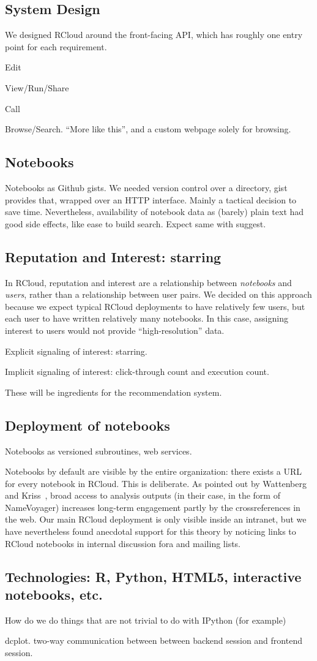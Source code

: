 \subsection{System Design}

We designed RCloud around the front-facing API, which has roughly one
entry point for each requirement.

Edit

View/Run/Share

Call

Browse/Search. ``More like this'', and a custom webpage solely for browsing.

\subsection{Notebooks\label{sec:notebooks}}

Notebooks as Github gists. 
%
We needed version control over a directory, gist provides that,
wrapped over an HTTP interface.
%
Mainly a tactical decision to save time.
%
Nevertheless, availability of notebook data as (barely) plain text had good side
effects, like ease to build search. 
%
Expect same with suggest.

\subsection{Reputation and Interest: starring\label{sec:starring}}

In RCloud, reputation and interest are a relationship between
\emph{notebooks} and \emph{users}, rather than a relationship between
user pairs. We decided on this approach because we expect typical
RCloud deployments to have relatively few users, but each user to have
 written relatively many notebooks.
In this case, assigning interest to users would not provide
``high-resolution'' data.

Explicit signaling of interest: starring.

Implicit signaling of interest: click-through count and execution
count.

These will be ingredients for the recommendation system.

\subsection{Deployment of notebooks\label{sec:deployment}}

Notebooks as versioned subroutines, web services.

Notebooks by default are visible by the entire organization: there
exists a URL for every notebook in RCloud. This is deliberate. As
pointed out by Wattenberg and Kriss~\cite{Wattenberg:2011:DFS}, broad
access to analysis outputs (in their case, in the form of NameVoyager)
increases long-term engagement partly by the crossreferences in the
web. Our main RCloud deployment is only visible inside an intranet,
but we have nevertheless found anecdotal support for this theory by
noticing links to RCloud notebooks in internal discussion fora and
mailing lists.

\subsection{Technologies: R, Python, HTML5, interactive notebooks, etc.}

How do we do things that are not trivial to do with IPython (for example)

dcplot. two-way communication between between backend session and
frontend session.

